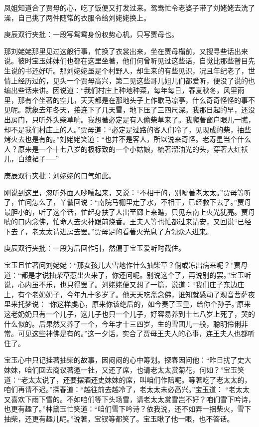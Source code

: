 \begin{parag}


    凤姐知道合了贾母的心，吃了饭便又打发过来。鸳鸯忙令老婆子带了刘姥姥去洗了澡，自己挑了两件随常的衣服令给刘姥姥换上。\begin{note}庚辰双行夹批：一段写鸳鸯身份权势心机，只写贾母也。\end{note}那刘姥姥那里见过这般行事，忙换了衣裳出来，坐在贾母榻前，又搜寻些话出来说。彼时宝玉姊妹们也都在这里坐著，他们何曾听见过这些话，自觉比那些瞽目先生说的书还好听。那刘姥姥虽是个村野人，却生来的有些见识，况且年纪老了，世情上经历过的，见头一个贾母高兴，第二见这些哥儿姐儿们都爱听，便没了说的也编出些话来讲。因说道：“我们村庄上种地种菜，每年每日，春夏秋冬，风里雨里，那有个坐著的空儿，天天都是在那地头子上作歇马凉亭，什么奇奇怪怪的事不见呢。就象去年冬天，接连下了几天雪，地下压了三四尺深。我那日起的早，还没出房门，只听外头柴草响。我想著必定是有人偷柴草来了。我爬著窗户眼儿一瞧，却不是我们村庄上的人。”贾母道：“必定是过路的客人们冷了，见现成的柴，抽些烤火去也是有的。”刘姥姥笑道：“也并不是客人，所以说来奇怪。老寿星当个什么人？原来是一个十七八岁的极标致的一个小姑娘，梳著溜油光的头，穿著大红袄儿，白绫裙子──”\begin{note}庚辰双行夹批：刘姥姥的口气如此。\end{note}刚说到这里，忽听外面人吵嚷起来，又说：“不相干的，别唬著老太太。”贾母等听了，忙问怎么了，丫鬟回说：“南院马棚里走了水，不相干，已经救下去了。”贾母最胆小的，听了这个话，忙起身扶了人出至廊上来瞧，只见东南上火光犹亮。贾母唬的口内念佛，忙命人去火神跟前烧香。王夫人等也忙都过来请安，又回说“已经下去了，老太太请进房去罢。”贾母足的看著火光息了方领众人进来。\begin{note}庚辰双行夹批：一段为后回作引，然偏于宝玉爱听时截住。\end{note}宝玉且忙著问刘姥姥：“那女孩儿大雪地作什么抽柴草？倘或冻出病来呢？”贾母道：“都是才说抽柴草惹出火来了，你还问呢。别说这个了，再说别的罢。”宝玉听说，心内虽不乐，也只得罢了。刘姥姥便又想了一篇，说道：“我们庄子东边庄上，有个老奶奶子，今年九十多岁了。他天天吃斋念佛，谁知就感动了观音菩萨夜里来托梦说： ‘你这样虔心，原来你该绝后的，如今奏了玉皇，给你个孙子。’原来这老奶奶只有一个儿子，这儿子也只一个儿子，好容易养到十七八岁上死了，哭的什么似的。后果然又养了一个，今年才十三四岁，生的雪团儿一般，聪明伶俐非常。可见这些神佛是有的。”这一夕话，实合了贾母王夫人的心事，连王夫人也都听住了。
\end{parag}


\begin{parag}


    宝玉心中只记挂著抽柴的故事，因闷闷的心中筹划。探春因问他：“昨日扰了史大妹妹，咱们回去商议著邀一社，又还了席，也请老太太赏菊花，何如？”宝玉笑道：“老太太说了，还要摆酒还史妹妹的席，叫咱们作陪呢。等著吃了老太太的，咱们再请不迟。”探春道：“越往前去越冷了，老太太未必高兴。”宝玉道： “老太太又喜欢下雨下雪的。不如咱们等下头场雪，请老太太赏雪岂不好？咱们雪下吟诗，也更有趣了。”林黛玉忙笑道：“咱们雪下吟诗？依我说，还不如弄一捆柴火，雪下抽柴，还更有趣儿呢。”说著，宝钗等都笑了。宝玉瞅了他一眼，也不答话。
\end{parag}


